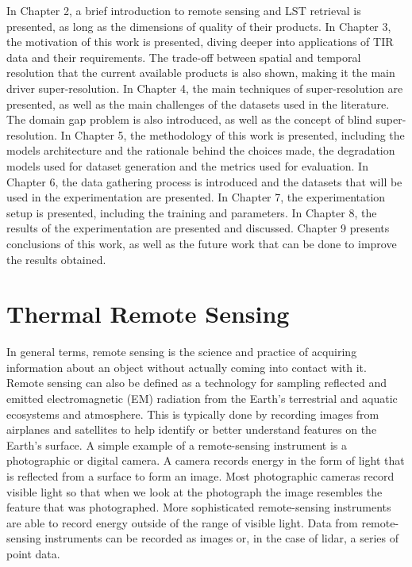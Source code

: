 In Chapter 2, a brief introduction to remote sensing and LST retrieval is presented, as long as the dimensions of quality of their products.
In Chapter 3, the motivation of this work is presented, diving deeper into applications of TIR data and their requirements.
The trade-off between spatial and temporal resolution that the current available products is also shown, making it the main driver super-resolution.
In Chapter 4, the main techniques of super-resolution are presented, as well as the main challenges of the datasets used in the literature.
The domain gap problem is also introduced, as well as the concept of blind super-resolution.
In Chapter 5, the methodology of this work is presented, including the models architecture and the rationale behind the choices made, the degradation models used for dataset generation and the metrics used for evaluation.
In Chapter 6, the data gathering process is introduced and the datasets that will be used in the experimentation are presented.
In Chapter 7, the experimentation setup is presented, including the training and parameters.
In Chapter 8, the results of the experimentation are presented and discussed.
Chapter 9 presents conclusions of this work, as well as the future work that can be done to improve the results obtained.
    
\section{Thermal Remote Sensing} \label{sec:thermal_remote_sensing}

In general terms, remote sensing is the science and practice of acquiring information about an object without actually coming into contact with it.
Remote sensing can also be defined as a technology for sampling reflected and emitted electromagnetic (EM) radiation from the Earth’s terrestrial and aquatic ecosystems and atmosphere.
This is typically done by recording images from airplanes and satellites to help identify or better understand features on the Earth’s surface.
A simple example of a remote-sensing instrument is a photographic or digital camera.
A camera records energy in the form of light that is reflected from a surface to form an image.
Most photographic cameras record visible light so that when we look at the photograph the image resembles the feature that was photographed.
More sophisticated remote-sensing instruments are able to record energy outside of the range of visible light.
Data from remote-sensing instruments can be recorded as images or, in the case of lidar, a series of point data.

